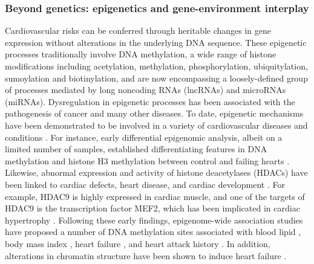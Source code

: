 \documentclass[letter]{bib}
\newcounter{example}[subsection]
\begin{document}
\subsubsection*{Beyond genetics: epigenetics and gene-environment interplay}	
	Cardiovascular risks can be conferred through heritable changes in gene expression without alterations in the underlying DNA sequence.  These epigenetic processes traditionally involve DNA methylation, a wide range of histone modifications including acetylation, methylation, phosphorylation, ubiquitylation, sumoylation and biotinylation, and are now encompassing a loosely-defined group of processes mediated by long noncoding RNAs (lncRNAs) and microRNAs (miRNAs). Dysregulation in epigenetic processes has been associated with the pathogenesis of cancer and many other diseases. To date, epigenetic mechanisms have been demonstrated to be involved in a variety of cardiovascular diseases and conditions \citep{Udali:2013:Cardiovascular,AbiKhalil:2014:emerging,Muka:2016:role,Gidlof:2016:Ischemic,Haitjema:2017:Additional}.
	For instance, early differential epigenomic analysis, albeit on a limited number of samples, established differentiating features in DNA methylation and histone H3 methylation between control and failing hearts \citep{Movassagh:2011:Distinct}.  Likewise, abnormal expression and activity of histone deacetylases (HDACs) have been linked to cardiac defects, heart disease, and cardiac development \citep{Haberland:2009:Many,Trivedi:2007:Hdac2,Chang:2004:Adult,McBurney:2003:Mammalian}.  For example, HDAC9 is highly expressed in cardiac muscle, and one of the targets of HDAC9 is the transcription factor MEF2, which has been implicated in cardiac hypertrophy \citep{Allis:2015:Epigenetics}.  Following these early findings, epigenome-wide association studies have proposed a number of DNA methylation sites associated with blood lipid \citep{Irvin:2014:Epigenomewide}, body mass index \citep{Dick:2014:DNA,Wahl:2017:Epigenomewide}, heart failure \citep{Meder:2017:EpigenomeWide}, and heart attack history \citep{Rask-Andersen:2016:Epigenomewide}. In addition, alterations in chromatin structure have been shown to induce heart failure \citep{Rosa-Garrido:2017:HighResolution}.  
	
\end{document}
